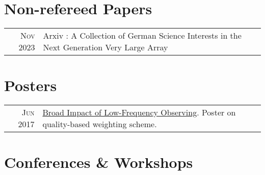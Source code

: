 \documentclass[11pt,a4paper,notitlepage]{article}
\begin{document}
\section{Non-refereed Papers}

\begin{tabular}{r|p{12.5cm}}
\textsc{Nov 2023} & Arxiv : A Collection of German Science Interests in the Next Generation Very Large Array \citep{2023arXiv231110056K} \\
\end{tabular}

\section{Posters}

\begin{tabular}{r|p{12.5cm}}
	\textsc{Jun 2017} & \href{https://www.radionet-org.eu/radionet/the-broad-impact-of-low-frequency-observing/}{Broad Impact of Low-Frequency Observing}. Poster on quality-based weighting scheme.\\
\end{tabular}

\section{Conferences \& Workshops}
\end{document}
